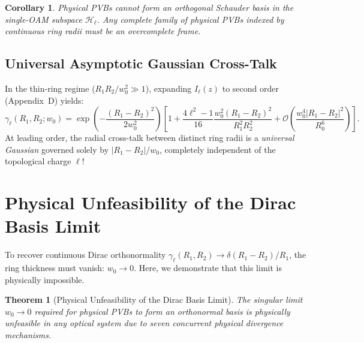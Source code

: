 \documentclass{optica-article}
\newtheorem{theorem}{Theorem}
\newtheorem{corollary}{Corollary}
\begin{document}
\begin{corollary}
Physical PVBs cannot form an orthogonal Schauder basis in the single-OAM subspace $\mathcal{H}_\ell$. Any complete family of physical PVBs indexed by continuous ring radii must be an overcomplete frame.
\end{corollary}

\subsection{Universal Asymptotic Gaussian Cross-Talk}

In the thin-ring regime ($R_1 R_2 / w_0^2 \gg 1$), expanding $I_\ell(z)$ to second order (Appendix~D) yields:
\begin{equation}
\boxed{\gamma_\ell(R_1, R_2; w_0) = \exp\left(-\frac{(R_1 - R_2)^2}{2 w_0^2}\right) \left[ 1 + \frac{4\ell^2 - 1}{16} \frac{w_0^2 (R_1 - R_2)^2}{R_1^2 R_2^2} + \mathcal{O}\left(\frac{w_0^4 |R_1 - R_2|^2}{R_0^6}\right) \right].}
\label{eq:asymptotic_overlap}
\end{equation}
At leading order, the radial cross-talk between distinct ring radii is a \emph{universal Gaussian} governed solely by $|R_1 - R_2| / w_0$, completely independent of the topological charge $\ell$!

\section{Physical Unfeasibility of the Dirac Basis Limit}
\label{sec:unfeasibility}

To recover continuous Dirac orthonormality $\gamma_\ell(R_1, R_2) \to \delta(R_1 - R_2) / R_1$, the ring thickness must vanish: $w_0 \to 0$. Here, we demonstrate that this limit is physically impossible.

\begin{theorem}[Physical Unfeasibility of the Dirac Basis Limit]
The singular limit $w_0 \to 0$ required for physical PVBs to form an orthonormal basis is physically unfeasible in any optical system due to seven concurrent physical divergence mechanisms.
\end{theorem}
\end{document}
